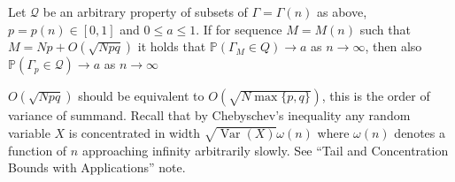 \documentclass{article}
\begin{document}
\begin{thma}\label{thma:cccc}
Let $\mathcal{Q}$ be an arbitrary property of subsets of $\Gamma=\Gamma(n)$ as above, $p=p(n) \in[0,1]$ and $0 \leq a \leq 1 .$ If for  sequence $M=M(n)$ such that $M=N p+O(\sqrt{N p q})$ it holds that $\mathbb{P}\left(\Gamma_{M} \in Q\right) \rightarrow a$ as $n \rightarrow \infty$, then also $\mathbb{P}\left(\Gamma_{p} \in \mathcal{Q}\right) \rightarrow a$ as $n \rightarrow \infty$
\end{thma}
\begin{rema}\label{rema:var}
$O(\sqrt{N p q})$ should be equivalent to $O(\sqrt{N \max\{p, q\}})$, this is the order of variance of summand. Recall that by Chebyschev's inequality any random variable $X$ is 
concentrated in width $\sqrt{\operatorname{Var}(X)} \omega(n) $ where $\omega(n)$ denotes a function of $n$ approaching infinity arbitrarily slowly. See ``Tail and Concentration Bounds with Applications'' note.
\end{rema}
\end{document}
